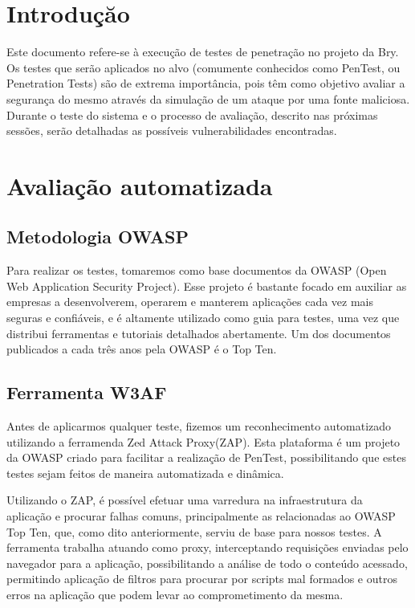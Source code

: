 \documentclass{ufscThesis}
\newcommand{\+}{\discretionary{\mbox{${\bm\cdot}\mkern-1mu$}}{}{}}
\renewcommand\+{\discretionary{}{}{}}
\begin{document}
\capa  

\sumario

\chapter{Introduçăo}
Este documento refere-se à execução de testes de penetração no projeto da Bry. Os testes que serão aplicados no alvo (comumente conhecidos como PenTest, ou Penetration Tests) são de extrema importância, pois têm como objetivo avaliar a segurança do mesmo através da simulação de um ataque por uma fonte maliciosa. Durante o teste do sistema e o processo de avaliação, descrito nas próximas sessões, serão detalhadas as possíveis vulnerabilidades encontradas.

\chapter{Avaliação automatizada}

\section{Metodologia OWASP}
Para realizar os testes, tomaremos como base documentos da OWASP (Open Web Application Security Project). Esse projeto é bastante focado em auxiliar as empresas a desenvolverem, operarem e manterem aplicações cada vez mais seguras e confiáveis, e é altamente utilizado como guia para testes, uma vez que distribui ferramentas e tutoriais detalhados abertamente. Um dos documentos publicados a cada três anos pela OWASP é o Top Ten.

\section{Ferramenta W3AF}
Antes de aplicarmos qualquer teste, fizemos um reconhecimento automatizado utilizando a ferramenda Zed Attack Proxy(ZAP). Esta plataforma é um projeto da OWASP criado para facilitar a realização de PenTest, possibilitando que estes testes sejam feitos de maneira automatizada e dinâmica.

Utilizando o ZAP, é possível efetuar uma varredura na infraestrutura da aplicação e procurar falhas comuns, principalmente as relacionadas ao OWASP Top Ten, que, como dito anteriormente, serviu de base para nossos testes. A ferramenta trabalha atuando  como proxy, interceptando requisições enviadas pelo navegador para a aplicação, possibilitando a análise de todo o conteúdo acessado, permitindo aplicação de filtros para procurar por scripts mal formados e outros erros na aplicação que podem levar ao comprometimento da mesma.
\end{document}
